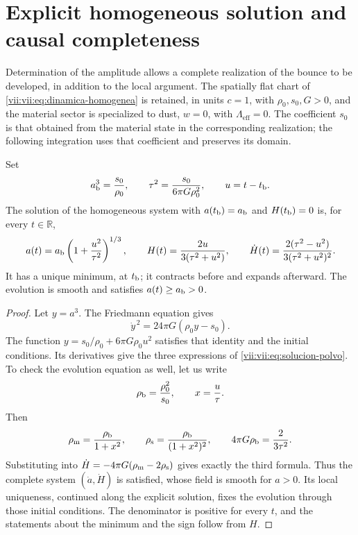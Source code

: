 \section{Explicit homogeneous solution and causal completeness}
\label{vii:vii:sec:solucion-homogenea}
Determination of the amplitude allows a complete realization
of the bounce to be developed, in addition to the local argument. The spatially
flat chart of \eqref{vii:vii:eq:dinamica-homogenea} is retained, in units
\(c=1\), with \(\rho_0,s_0,G>0\), and the material sector is specialized
to dust, \(w=0\), with \(\Lambda_{\mathrm{eff}}=0\).
The coefficient \(s_0\) is that obtained from the material
state in the corresponding realization; the following integration
uses that coefficient and preserves its domain.

\begin{theorem}
\label{vii:vii:thm:rebote-polvo}
Set
\[
 a_{\rm b}^3=\frac{s_0}{\rho_0},\qquad
 \tau^2=\frac{s_0}{6\pi G\rho_0^2},\qquad u=t-t_{\rm b}.
\]
The solution of the homogeneous system with
\(a(t_{\rm b})=a_{\rm b}\) and \(H(t_{\rm b})=0\) is, for every
\(t\in\mathbb R\),
\begin{equation}
 a(t)=a_{\rm b}\left(1+\frac{u^2}{\tau^2}\right)^{1/3},
 \qquad H(t)=\frac{2u}{3(\tau^2+u^2)},\qquad
 \dot H(t)=\frac{2(\tau^2-u^2)}{3(\tau^2+u^2)^2}.
 \label{vii:vii:eq:solucion-polvo}
\end{equation}
It has a unique minimum, at \(t_{\rm b}\); it contracts before and
expands afterward. The evolution is smooth and satisfies
\(a(t)\geq a_{\rm b}>0\).
\end{theorem}
\begin{proof}
Let \(y=a^3\). The Friedmann equation gives
\[
 \dot y^{\,2}=24\pi G(\rho_0y-s_0).
\]
The function \(y=s_0/\rho_0+6\pi G\rho_0u^2\) satisfies that
identity and the initial conditions. Its derivatives give the
three expressions of \eqref{vii:vii:eq:solucion-polvo}. To check
the evolution equation as well, let us write
\[
 \rho_{\rm b}=\frac{\rho_0^2}{s_0},\qquad
 x=\frac{u}{\tau}.
\]
Then
\[
 \rho_{\rm m}=\frac{\rho_{\rm b}}{1+x^2},\qquad
 \rho_{\rm s}=\frac{\rho_{\rm b}}{(1+x^2)^2},\qquad
 4\pi G\rho_{\rm b}=\frac{2}{3\tau^2}.
\]
Substituting into \(\dot H=-4\pi G(\rho_{\rm m}-2\rho_{\rm s})\)
gives exactly the third formula. Thus the complete
system \((\dot a,\dot H)\) is satisfied, whose field is smooth
for \(a>0\). Its local uniqueness, continued along the explicit
solution, fixes the evolution through those initial conditions.
The denominator is positive for every \(t\), and the statements
about the minimum and the sign follow from \(H\).
\end{proof}

